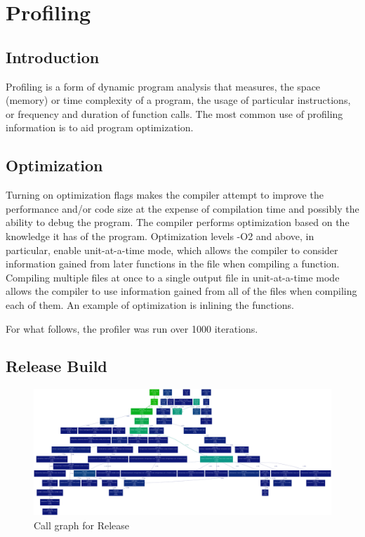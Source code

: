 \documentclass[11pt]{article}
\begin{document}
\section{Profiling}
\subsection{Introduction}

Profiling is a form of dynamic program analysis that measures, the space (memory) or time complexity of a program, the usage of particular instructions, or frequency and duration of function calls. The most common use of profiling information is to aid program optimization.

\subsection{Optimization}
Turning on optimization flags makes the compiler attempt to improve the performance and/or code size at the expense of compilation time and possibly the ability to debug the program. The compiler performs optimization based on the knowledge it has of the program. Optimization levels -O2 and above, in particular, enable unit-at-a-time mode, which allows the compiler to consider information gained from later functions in the file when compiling a function. Compiling multiple files at once to a single output file in unit-at-a-time mode allows the compiler to use information gained from all of the files when compiling each of them. An example of optimization is inlining the functions.

For what follows, the profiler was run over 1000 iterations.

\subsection{Release Build}


\begin{figure}[ht!]
\centering
\includegraphics[width=150mm]{g32_release_prof.png}
\caption{Call graph for Release}
\label{overflow}
\end{figure}
\end{document}
